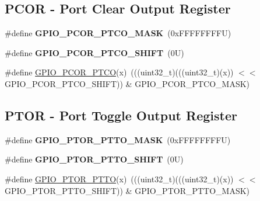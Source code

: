 \subsection*{P\+C\+OR -\/ Port Clear Output Register}
\begin{DoxyCompactItemize}
\item 
\mbox{\label{group___f_g_p_i_o___register___masks_ga0b8378768ee61ea2c685a1687c90fa03}} 
\#define {\bfseries G\+P\+I\+O\+\_\+\+P\+C\+O\+R\+\_\+\+P\+T\+C\+O\+\_\+\+M\+A\+SK}~(0x\+F\+F\+F\+F\+F\+F\+F\+F\+U)
\item 
\mbox{\label{group___f_g_p_i_o___register___masks_ga5c9203b830cbd86cd8d0189872b5c772}} 
\#define {\bfseries G\+P\+I\+O\+\_\+\+P\+C\+O\+R\+\_\+\+P\+T\+C\+O\+\_\+\+S\+H\+I\+FT}~(0\+U)
\item 
\#define \mbox{\hyperlink{group___f_g_p_i_o___register___masks_ga3a9c3710923cd50fc2df4e678180eb1d}{G\+P\+I\+O\+\_\+\+P\+C\+O\+R\+\_\+\+P\+T\+CO}}(x)~(((uint32\+\_\+t)(((uint32\+\_\+t)(x)) $<$$<$ G\+P\+I\+O\+\_\+\+P\+C\+O\+R\+\_\+\+P\+T\+C\+O\+\_\+\+S\+H\+I\+FT)) \& G\+P\+I\+O\+\_\+\+P\+C\+O\+R\+\_\+\+P\+T\+C\+O\+\_\+\+M\+A\+SK)
\end{DoxyCompactItemize}
\subsection*{P\+T\+OR -\/ Port Toggle Output Register}
\begin{DoxyCompactItemize}
\item 
\mbox{\label{group___f_g_p_i_o___register___masks_gaa75953b5d9d23bdaa6c24232e1a52680}} 
\#define {\bfseries G\+P\+I\+O\+\_\+\+P\+T\+O\+R\+\_\+\+P\+T\+T\+O\+\_\+\+M\+A\+SK}~(0x\+F\+F\+F\+F\+F\+F\+F\+F\+U)
\item 
\mbox{\label{group___f_g_p_i_o___register___masks_ga70e5442b3a119665aafb9e6e5b48bbd5}} 
\#define {\bfseries G\+P\+I\+O\+\_\+\+P\+T\+O\+R\+\_\+\+P\+T\+T\+O\+\_\+\+S\+H\+I\+FT}~(0\+U)
\item 
\#define \mbox{\hyperlink{group___f_g_p_i_o___register___masks_ga40757476c8889ca9d4cb7017b6c5ab60}{G\+P\+I\+O\+\_\+\+P\+T\+O\+R\+\_\+\+P\+T\+TO}}(x)~(((uint32\+\_\+t)(((uint32\+\_\+t)(x)) $<$$<$ G\+P\+I\+O\+\_\+\+P\+T\+O\+R\+\_\+\+P\+T\+T\+O\+\_\+\+S\+H\+I\+FT)) \& G\+P\+I\+O\+\_\+\+P\+T\+O\+R\+\_\+\+P\+T\+T\+O\+\_\+\+M\+A\+SK)
\end{DoxyCompactItemize}
